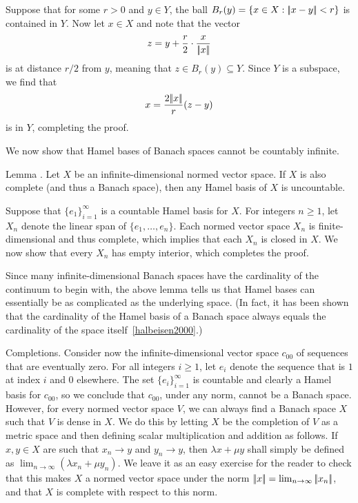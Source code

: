 \proof Suppose that for some $r>0$ and $y\in Y$, the ball $B_r(y) = \{x\in X : |\!|x-y|\!| < r\}$ is contained
in $Y$. Now let $x\in X$ and note that the vector
$$z = y + {r\over 2}\cdot{x\over|\!|x|\!|}$$
is at distance $r/2$ from $y$, meaning that $z\in B_r(y)\subseteq Y$. Since $Y$ is a subspace, we find that
$$x = {2|\!|x|\!|\over r}(z-y)$$
is in $Y$, completing the proof.\slug

We now show that Hamel bases of Banach spaces cannot be countably infinite.

\proclaim Lemma \advthm. Let $X$ be an infinite-dimensional normed vector space. If $X$ is also complete
(and thus a Banach space), then any Hamel basis of $X$ is uncountable.

\proof Suppose that $\{e_1\}_{i=1}^\infty$ is a countable Hamel basis for $X$. For integers $n\ge 1$,
let $X_n$ denote the linear span of $\{e_1,\ldots,e_n\}$. Each normed vector space $X_n$ is finite-dimensional
and thus complete, which implies that each $X_n$ is closed in $X$. We now show that every $X_n$ has empty
interior, which completes the proof.\slug

Since many infinite-dimensional
Banach spaces have the cardinality of the continuum to begin with,
the above lemma tells us that Hamel bases can essentially be as complicated as the underlying space.
(In fact, it has been shown that
the cardinality of the Hamel basis of a Banach space always equals the cardinality of the space
itself~\ref{halbeisen2000}.)

\medskip\boldlabel Completions.
Consider now the infinite-dimensional vector space $c_{00}$ of sequences that are eventually zero. For all
integers $i\ge 1$, let $e_i$ denote the sequence that is $1$ at index $i$ and $0$ elsewhere. The set
$\{e_i\}_{i=1}^\infty$ is countable and clearly
a Hamel basis for $c_{00}$, so we conclude that $c_{00}$, under any norm, cannot be a Banach space. However,
for every normed vector space $V$, we can always find a Banach space $X$ such that $V$ is dense in $X$.
We do this by letting $X$ be the completion of $V$ as a metric space and then defining scalar multiplication
and addition as follows. If $x,y\in X$ are such that $x_n\to y$ and $y_n\to y$, then $\lambda x+\mu y$
shall simply be defined as $\lim_{n\to \infty} (\lambda x_n + \mu y_n)$. We leave it as an easy exercise
for the reader to check
that this makes $X$ a normed vector space under the norm $|\!|x|\!| = \lim_{n\to\infty}|\!|x_n|\!|$, and that
$X$ is complete with respect to this norm.

